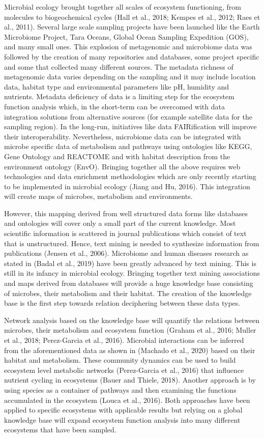 Microbial ecology brought together all scales of ecosystem functioning, from molecules to biogeochemical cycles (Hall et al., 2018; Kempes et al., 2012; Raes et al., 2011). Several large scale sampling projects have been launched like the Earth Microbiome Project, Tara Oceans,  Global Ocean Sampling Expedition (GOS),  and many small ones. This explosion of metagenomic and microbiome data was followed by the creation of many repositories and databases, some project specific and some that collected many different sources. The metadata richness of metagenomic data varies depending on the sampling and it may include location data, habitat type and environmental parameters like pH, humidity and nutrients. Metadata deficiency of data is a limiting step for the ecosystem function analysis which, in the short-term can be overcomed with data integration solutions from alternative sources (for example satellite data for the sampling region). In the long-run, initiatives like data FAIRification will improve their interoperability. Nevertheless, microbiome data can be integrated with microbe specific data of metabolism and pathways using ontologies like KEGG, Gene Ontology and REACTOME and with habitat description from the environment ontology (EnvO). Bringing together all the above requires web technologies and data enrichment methodologies which are only recently starting to be implemented in microbial ecology (Jiang and Hu, 2016). This integration will create maps of microbes, metabolism and environments. 

However, this mapping derived from well structured data forms like databases and ontologies will cover only a small part of the current knowledge. Most scientific information is scattered in journal publications which consist of text that is unstructured. Hence, text mining is needed to synthesize information from publications (Jensen et al., 2006). Microbiome and human diseases research as stated in (Badal et al., 2019) have been greatly advanced by text mining. This is still in its infancy in microbial ecology. Bringing together text mining associations and maps derived from databases will provide a huge knowledge base consisting of microbes, their metabolism and their habitat. The creation of the knowledge base is the first step towards relation deciphering between these data types. 

Network analysis based on the knowledge base will quantify the relations between microbes, their metabolism and ecosystem function (Graham et al., 2016; Muller et al., 2018; Perez-Garcia et al., 2016). Microbial interactions can be inferred from the aforementioned data as shown in (Machado et al., 2020) based on their habitat and metabolism. These community dynamics can be used to build ecosystem level metabolic networks (Perez-Garcia et al., 2016) that influence nutrient cycling in ecosystems (Bauer and Thiele, 2018). Another approach is by using species as a container of pathways and then examining the functions accumulated in the ecosystem (Louca et al., 2016). Both approaches have been applied to specific ecosystems with applicable results but relying on a global knowledge base will expand ecosystem function analysis into many different ecosystems that have been sampled.

